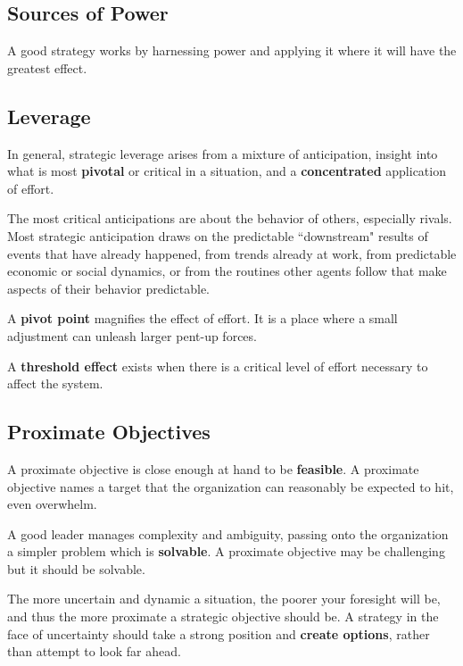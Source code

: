 \documentclass{article}
\begin{document}
\begin{center}
\section{Sources of Power}
\end{center}

\begin{multicols}{2}

\noindent
A good strategy works by harnessing power and applying it where it will have the greatest effect.

\subsection{Leverage}
In general, strategic leverage arises from a mixture of anticipation, insight into what is most \textbf{pivotal} or critical in a situation, and a \textbf{concentrated} application of effort.

The most critical anticipations are about the behavior of others, especially rivals. Most strategic anticipation draws on the predictable ``downstream" results of events that have already happened, from trends already at work, from predictable economic or social dynamics, or from the routines other agents follow that make aspects of their behavior predictable.

A \textbf{pivot point} magnifies the effect of effort. It is a place where a small adjustment can unleash larger pent-up forces.

A \textbf{threshold effect} exists when there is a critical level of effort necessary to affect the system.

\subsection{Proximate Objectives}

A proximate objective is close enough at hand to be \textbf{feasible}. A proximate objective names a target that the organization can reasonably be expected to hit, even overwhelm.

A good leader manages complexity and ambiguity, passing onto the organization a simpler problem which is \textbf{solvable}. A proximate objective may be challenging but it should be solvable.

The more uncertain and dynamic a situation, the poorer your foresight will be, and thus the more proximate a strategic objective should be. A strategy in the face of uncertainty should take a strong position and \textbf{create options}, rather than attempt to look far ahead.


\end{multicols}
\end{document}
